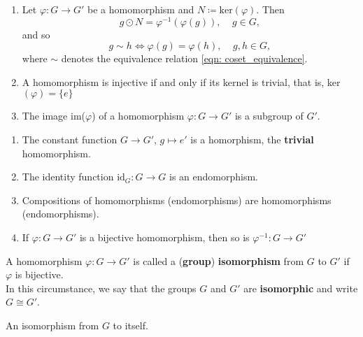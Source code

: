 \begin{remark}
\begin{enumerate}[label=(\alph*)]
		\item Let \(\varphi \colon G \rightarrow G{}'\) be a homomorphism and \(N \coloneqq\text{ker}\left(\varphi\right) \). Then
		\[
			g \odot N = \varphi^{-1}(\varphi(g)), \:\:\:\:\:       g \in G, 	
		\]
		and so
		\[
			g \sim h \Leftrightarrow \varphi(g) = \varphi(h), \:\:\:\:\: g,h \in G,	
		\]
		where \(\sim\) denotes the equivalence relation \ref{eqn: coset_equivalence}.

		\item A homomorphism is injective if and only if its kernel is trivial, that is,
		ker\(\left(\varphi\right) = \{e\}\)
		\item The image im(\(\varphi\)) of a homomorphism \(\varphi \colon G \rightarrow G{}'\) is a subgroup of \(G{}'\).
	\end{enumerate}
\end{remark}

\begin{eg}  
	\begin{enumerate}[label=(\alph*)]
		\item The constant function \(G \rightarrow G{}'\), \(g \mapsto e{}'\) is a homorphism,
		the \textbf{trivial} homomorphism.
		\item The identity function \(\text{id}_G \colon G \rightarrow G\) is an endomorphism.
		\item Compositions of homomorphisms (endomorphisms) are homomorphisms (endomorphisms).
		\item If \(\varphi \colon G \rightarrow G{}'\) is a bijective homomorphism, then so is
		\(\varphi^{-1} \colon G \rightarrow G{}'\)
	\end{enumerate}
\end{eg}

\begin{definition}[Isomorphism]\label{def: isomorphism}
	A homomorphism \(\varphi \colon G \rightarrow G{}'\) is called a (\textbf{group}) \textbf{isomorphism}
	from \(G\) to \(G{}'\) if \(\varphi\) is bijective. \\
	In this circumstance, we say that the groups \(G\) and \(G{}'\) are \textbf{isomorphic} and write
	\(G \cong G{}'\). 
\end{definition} 

\begin{definition}[Automorphism]\label{def: automorphism}
	An isomorphism from \(G\) to itself. 
\end{definition}



